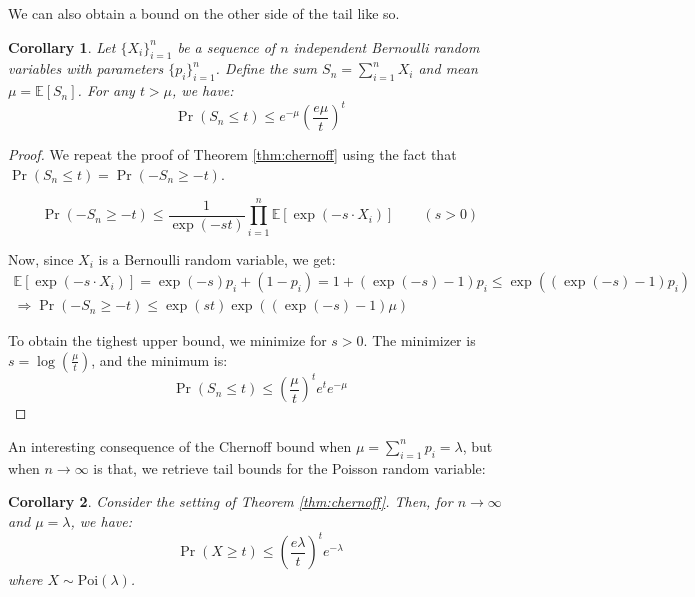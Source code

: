 \documentclass{article}
\newtheorem{corollary}{Corollary}[subsection]
\theoremstyle{remark}
\newcommand{\Exp}{\mathbb{E}}
\begin{document}
We can also obtain a bound on the other side of the tail like so.
\begin{corollary}
Let \(\{X_{i}\}_{i=1}^{n}\) be a sequence of \(n\) independent Bernoulli random variables with parameters \(\{p_{i}\}_{i=1}^{n}\). Define the sum \(S_{n} = \sum\limits_{i=1}^{n} X_{i}\) and mean \(\mu = \Exp\left[S_{n}\right]\). For any \(t > \mu\), we have:
\begin{equation*}
\Pr(S_{n} \leq t) \leq e^{-\mu} \left(\frac{e\mu}{t}\right)^{t}
\end{equation*}
\end{corollary}

\begin{proof}
We repeat the proof of Theorem \ref{thm:chernoff} using the fact that \(\Pr(S_{n} \leq t) = \Pr(-S_{n} \geq -t)\).

\begin{equation*}
\Pr(-S_{n} \geq -t) \leq \frac{1}{\exp(-st)}\prod_{i=1}^{n}\Exp\left[\exp(-s \cdot X_{i})\right] \qquad (s > 0)
\end{equation*}

Now, since \(X_{i}\) is a Bernoulli random variable, we get:
\begin{gather*}
\Exp\left[\exp(-s \cdot X_{i})\right] = \exp(-s)p_{i} + (1 - p_{i}) = 1 + (\exp(-s) - 1)p_{i} \leq \exp((\exp(-s) - 1)p_{i}) \\
\Rightarrow \Pr(-S_{n} \geq -t) \leq \exp(st)\exp((\exp(-s) - 1)\mu)
\end{gather*}

To obtain the tighest upper bound, we minimize for \(s > 0\). The minimizer is \(s = \log\left(\frac{\mu}{t}\right)\), and the minimum is:
\begin{equation*}
\Pr(S_{n} \leq t) \leq \left(\frac{\mu}{t}\right)^{t}e^{t}e^{-\mu}
\end{equation*}
\end{proof}

An interesting consequence of the Chernoff bound when \(\mu = \sum\limits_{i=1}^{n} p_{i} = \lambda\), but when \(n \to \infty\) is that, we retrieve tail bounds for the Poisson random variable:
\begin{corollary}
Consider the setting of Theorem \ref{thm:chernoff}. Then, for \(n \to \infty\) and \(\mu = \lambda\), we have:
\begin{equation*}
\Pr(X \geq t) \leq \left(\frac{e\lambda}{t}\right)^{t} e^{-\lambda}
\end{equation*}
where \(X \sim \mathrm{Poi}(\lambda)\).
\end{corollary}
\end{document}
